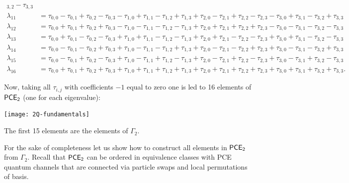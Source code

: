 \begin{align}
   _{3,2}-\tau _{3,3}\nonumber \\
\lambda_{11}&=   
 \tau _{0,0}-\tau _{0,1}+\tau _{0,2}-\tau _{0,3}-\tau _{1,0}+\tau _{1,1}-\tau _{1,2}+\tau
   _{1,3}+\tau _{2,0}-\tau _{2,1}+\tau _{2,2}-\tau _{2,3}-\tau _{3,0}+\tau _{3,1}-\tau
   _{3,2}+\tau _{3,3}\nonumber \\
\lambda_{12}&=   
 \tau _{0,0}+\tau _{0,1}+\tau _{0,2}+\tau _{0,3}-\tau _{1,0}-\tau _{1,1}-\tau _{1,2}-\tau
   _{1,3}+\tau _{2,0}+\tau _{2,1}+\tau _{2,2}+\tau _{2,3}-\tau _{3,0}-\tau _{3,1}-\tau
   _{3,2}-\tau _{3,3}\nonumber \\
\lambda_{13}&=   
 \tau _{0,0}+\tau _{0,1}-\tau _{0,2}-\tau _{0,3}+\tau _{1,0}+\tau _{1,1}-\tau _{1,2}-\tau
   _{1,3}+\tau _{2,0}+\tau _{2,1}-\tau _{2,2}-\tau _{2,3}+\tau _{3,0}+\tau _{3,1}-\tau
   _{3,2}-\tau _{3,3}\nonumber \\
\lambda_{14}&=   
 \tau _{0,0}-\tau _{0,1}-\tau _{0,2}+\tau _{0,3}+\tau _{1,0}-\tau _{1,1}-\tau _{1,2}+\tau
   _{1,3}+\tau _{2,0}-\tau _{2,1}-\tau _{2,2}+\tau _{2,3}+\tau _{3,0}-\tau _{3,1}-\tau
   _{3,2}+\tau _{3,3}\nonumber \\
\lambda_{15}&=   
 \tau _{0,0}-\tau _{0,1}+\tau _{0,2}-\tau _{0,3}+\tau _{1,0}-\tau _{1,1}+\tau _{1,2}-\tau
   _{1,3}+\tau _{2,0}-\tau _{2,1}+\tau _{2,2}-\tau _{2,3}+\tau _{3,0}-\tau _{3,1}+\tau
   _{3,2}-\tau _{3,3}\nonumber \\
\lambda_{16}&=  
 \tau _{0,0}+\tau _{0,1}+\tau _{0,2}+\tau _{0,3}+\tau _{1,0}+\tau _{1,1}+\tau _{1,2}+\tau
   _{1,3}+\tau _{2,0}+\tau _{2,1}+\tau _{2,2}+\tau _{2,3}+\tau _{3,0}+\tau _{3,1}+\tau
   _{3,2}+\tau _{3,3}. 
\end{align}

Now, taking all $\tau_{i,j}$ with coefficients $-1$ equal to zero 
one is led to 16 elements of $\mathsf{PCE}_\mathsf{2}$ (one for each eigenvalue): \newline

\texttt{[image: 2Q-fundamentals]}

The first 15 elements are the elements of $\Gamma_2$. 

For the sake
of completeness let us show how to construct all elements in $\mathsf{PCE}_\mathsf{2}$
from $\Gamma_2$. Recall that $\mathsf{PCE}_\mathsf{2}$ can be ordered in 
equivalence classes with PCE quantum channels that are 
connected via particle swaps and local permutations 
of basis.


